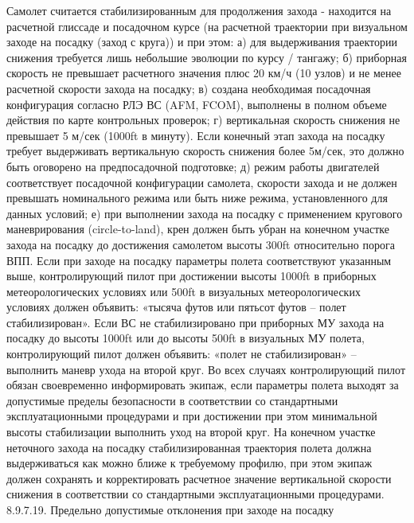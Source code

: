 Самолет считается стабилизированным для продолжения захода - находится на расчетной глиссаде и посадочном курсе (на расчетной траектории при визуальном заходе на посадку (заход с круга)) и при этом:
а)	для выдерживания траектории снижения требуется лишь небольшие эволюции по курсу / тангажу;
б)	приборная скорость не превышает расчетного значения плюс 20 км/ч (10 узлов) и не менее расчетной скорости захода на посадку;
в)	создана необходимая посадочная конфигурация согласно РЛЭ ВС (AFM, FCOM), выполнены в полном объеме действия по карте контрольных проверок;
г)	вертикальная скорость снижения не превышает 5 м/сек (1000ft в минуту). Если конечный этап захода на посадку требует выдерживать вертикальную скорость снижения более 5м/сек, это должно быть оговорено на предпосадочной подготовке;
д)	режим работы двигателей соответствует посадочной конфигурации самолета, скорости захода и не должен превышать номинального режима или быть ниже режима, установленного для данных условий;
е)	при выполнении захода на посадку с применением кругового маневрирования (circle-to-land), крен должен быть убран на конечном участке захода на посадку до достижения самолетом высоты 300ft относительно порога ВПП.
Если при заходе на посадку параметры полета соответствуют указанным выше, контролирующий пилот при достижении высоты 1000ft в приборных метеорологических условиях или 500ft в визуальных метеорологических условиях должен объявить: «тысяча футов или пятьсот футов – полет стабилизирован».
Если ВС не стабилизировано при приборных МУ захода на посадку до высоты 1000ft или до высоты 500ft в визуальных МУ полета, контролирующий пилот должен объявить: «полет не стабилизирован» – выполнить маневр ухода на второй круг.
Во всех случаях контролирующий пилот обязан своевременно информировать экипаж, если параметры полета выходят за допустимые пределы безопасности в соответствии со стандартными эксплуатационными процедурами и при достижении при этом минимальной высоты стабилизации выполнить уход на второй круг.
На конечном участке неточного захода на посадку стабилизированная траектория полета должна выдерживаться как можно ближе к требуемому профилю, при этом экипаж должен сохранять и корректировать расчетное значение вертикальной скорости снижения в соответствии со стандартными эксплуатационными процедурами.
8.9.7.19.	Предельно допустимые отклонения при заходе на посадку
  
